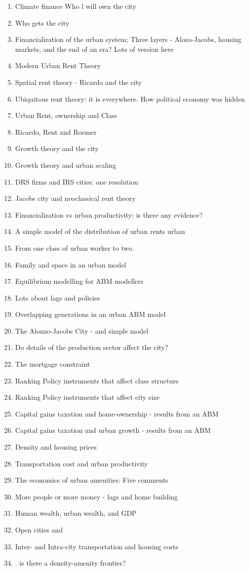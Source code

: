 \documentclass[]{article}
\begin{document}
 
\begin{enumerate}
    \item {\color{red}Climate finance Who l will own  the city}
    \item {\color{red}Who gets the city}
    \item {\color{red!30}Financialization of the urban system; Three layers - Alozo-Jacobs, housing markets, and the end of an era? }
Lots of version here
    \item Modern Urban Rent Theory
    \item Spatial rent theory - Ricardo and the city
    \item Ubiquitous rent theory: it is everywhere. How political economy was hidden
    \item Urban Rent, ownership and Class 
    \item {\color{red!90}Ricardo, Rent and Roemer}
    \item Growth theory and the city
    \item Growth theory and urban scaling
    \item DRS firms and IRS cities: one resolution
    \item Jacobs city and neoclassical rent theory
    \item Financialization vs urban productivity: is there any evidence?
    \item A simple model of the distribution of urban rents urban 
    \item From one class of urban worker to two.
    \item Family and space in an urban model
    \item Equilibrium modelling for ABM modellers 
    \item Lots about lags and policies
    \item Overlapping generations in an urban ABM model 
    \item The Alonzo-Jacobs City - and simple model
    \item Do details of the production sector affect the city?
    \item The mortgage constraint
    \item Ranking Policy instruments that affect class structure
    \item Ranking Policy instruments that affect city size 
    \item Capital gains taxation and home-ownership - results from an ABM
    \item Capital gains taxation and urban growth - results from an ABM
    \item Density and housing prices
    \item Transportation cost and urban productivity
    \item The economics of urban amenities: Five comments
    \item More people or more money - lags and home building 
    \item Human wealth, urban wealth, and GDP
    \item Open cities and 
    \item Inter- and Intra-city transportation and housing costs
    \item. is there a density-amenity frontier?

\end{enumerate}
\end{document}
